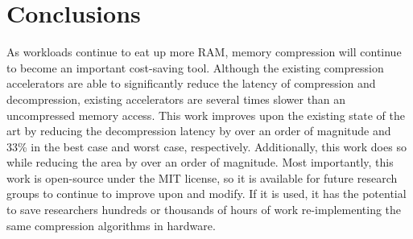 \documentclass[doublespace,nopageskip]{VTthesis}
\begin{document}
\chapter{Conclusions} \label{ch:conclusions}
As workloads continue to eat up more RAM, memory compression will continue to become an important cost-saving tool. Although the existing compression accelerators are able to significantly reduce the latency of compression and decompression, existing accelerators are several times slower than an uncompressed memory access. This work improves upon the existing state of the art by reducing the decompression latency by over an order of magnitude and 33\% in the best case and worst case, respectively. Additionally, this work does so while reducing the area by over an order of magnitude. Most importantly, this work is open-source under the MIT license, so it is available for future research groups to continue to improve upon and modify. If it is used, it has the potential to save researchers hundreds or thousands of hours of work re-implementing the same compression algorithms in hardware.


   


\end{document}
